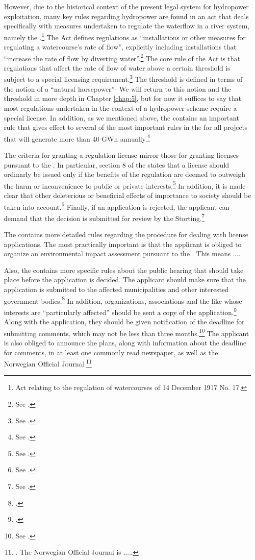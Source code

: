 However, due to the historical context of the present legal system for hydropower exploitation, many key rules regarding hydropower are found in an act that deals specifically with measures undertaken to regulate the waterflow in a river system, namely the \cite{wra17}.\footnote{Act relating to the regulation of watercourses of 14 December 1917 No. 17.} The Act defines regulations as ``installations or other measures for regulating a watercourse's rate of flow'', explicitly including installations that ``increase the rate of flow by diverting water''.\footnote{See \cite[1]{wra17}.} The core rule of the Act is that regulations that affect the rate of flow of water above a certain threshold is subject to a special licensing requirement.\footnote{See \cite[2]{wra17}.} The threshold is defined in terms of the notion of a ``natural horsepower''- We will return to this notion and the threshold in more depth in Chapter \ref{chap:5}, but for now it suffices to say that most regulations undertaken in the context of a hydropower scheme require a special license. In addition, as we mentioned above, the \cite{wra00} contains an important rule that gives effect to several of the most important rules in the \cite{wra17} for all projects that will generate more than 40 GWh annually.\footnote{See \cite[19]{wra00}.}

The criteria for granting a regulation license mirror those for granting licenses pursuant to the \cite{wra00}. In particular, section 8 of the \cite{wra17} states that a license should ordinarly be issued only if the benefits of the regulation are deemed to outweigh the harm or inconvenience to public or private interests.\footnote{See \cite[8]{wra17}.} In addition, it is made clear that other deleterious or beneficial effects of importance to society should be taken into account.\footnote{See \cite[8]{wra17}.} Finally, if an application is rejected, the applicant can demand that the decision is submitted for review by the Storting.\footnote{See \cite[8]{wra17}.}

The \cite{wra17} contains more detailed rules regarding the procedure for dealing with license applications. The most practically important is that the applicant is obliged to organize an environmental impact assessment pursuant to the \cite{pba..}. This means ....

Also, the \cite{wra17} contains more specific rules about the public hearing that should take place before the application is decided. The applicant should make sure that the application is submitted to the affected municipalities and other interested government bodies.\footcite[6]{wra17} In addition, organizations, associations and the like whose interests are ``particularly affected'' should be sent a copy of the application.\footcite[6]{wra17} Along with the application, they should be given notification of the deadline for submitting comments, which may not be less than three months.\footnote{See \cite[6]{wra17}.} The applicant is also obliged to announce the plans, along with information about the deadline for comments, in at least one commonly read newspaper, as well as the Norwegian Official Journal.\footnote{\cite[6]{wra17}. The Norwegian Official Journal is .....}


